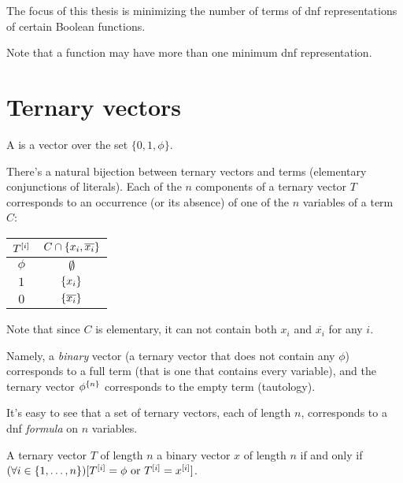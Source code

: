 The focus of this thesis is
minimizing the number of terms
of \acrshort{dnf} representations
of certain Boolean functions.

Note that a function may have more than one minimum
\acrshort{dnf} representation.

\section{Ternary vectors}

\begin{definition}
A 
is a vector over the set
$\{0, 1, \phi\}$.
\end{definition}

There's a natural bijection between ternary vectors
and terms (elementary conjunctions of literals).
Each of the $n$ components of a ternary vector $T$
corresponds to an occurrence (or its absence)
of one of the $n$ variables of a term $C$:

\begin{center}
\begin{tabular}{cc}
$T^{[i]}$ & $C \cap \{x_i, \overline{x_i}\}$ \\
\hline
$\phi$ & $\emptyset$ \\
$1$ & $\{x_i\}$ \\
$0$ & $\{\overline{x_i}\}$
\end{tabular}
\end{center}

Note that since $C$ is elementary,
it can not contain both $x_i$ and $\overline{x_i}$
for any $i$.

Namely,
a \emph{binary} vector
(a ternary vector that does not contain any $\phi$)
corresponds to a full term
(that is one that contains every variable),
and the ternary vector $\phi^{\{n\}}$
corresponds to the empty term (tautology).

It's easy to see that a set of ternary vectors,
each of length $n$,
corresponds to a \acrshort{dnf} \emph{formula}
on $n$ variables.

\begin{definition}
A ternary vector $T$ of length $n$ 
a binary vector $x$ of length $n$
if and only if
$(\forall i \in \{1, \ldots, n\}) [T^{[i]} = \phi \text{ or } T^{[i]} = x^{[i]}]$.
\end{definition}

